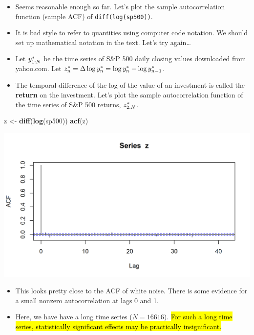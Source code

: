 \documentclass[]{article}
\newenvironment{Shaded}{\begin{snugshade}}{\end{snugshade}}
\newcommand{\KeywordTok}[1]{\textcolor[rgb]{0.13,0.29,0.53}{\textbf{#1}}}
\newcommand{\StringTok}[1]{\textcolor[rgb]{0.31,0.60,0.02}{#1}}
\newcommand{\NormalTok}[1]{#1}
\begin{document}
\begin{itemize}
\item
  Seems reasonable enough so far. Let's plot the sample autocorrelation
  function (sample ACF) of \texttt{diff(log(sp500))}.
\item
  It is bad style to refer to quantities using computer code notation.
  We should set up mathematical notation in the text. Let's try
  again\ldots{}
\item
  Let \(y_{1:N}^*\) be the time series of S\&P 500 daily closing
  values downloaded from yahoo.com. Let
  \(z_n^*= \Delta \log y_n^* = \log y_{n}^*-\log y_{n-1}^*\).
\item
  The temporal difference of the log of the value of an investment is
  called the \textbf{return} on the investment. Let's plot the sample
  autocorrelation function of the time series of S\&P 500 returns,
  \(z_{2:N}^*\).
\end{itemize}

\begin{Shaded}
\begin{Highlighting}[]
\NormalTok{z <-}\StringTok{ }\KeywordTok{diff}\NormalTok{(}\KeywordTok{log}\NormalTok{(sp500))}
\KeywordTok{acf}\NormalTok{(z)}
\end{Highlighting}
\end{Shaded}

\includegraphics{figure/intro-sp500_acf-1.png}

\begin{itemize}
\item
  This looks pretty close to the ACF of white noise. There is some
  evidence for a small nonzero autocorrelation at lags 0 and 1.
\item
  Here, we have have a long time series (\(N=16616\)). \hl{For such a long
  time series, statistically significant effects may be practically
  insignificant.}
\end{itemize}
\end{document}
